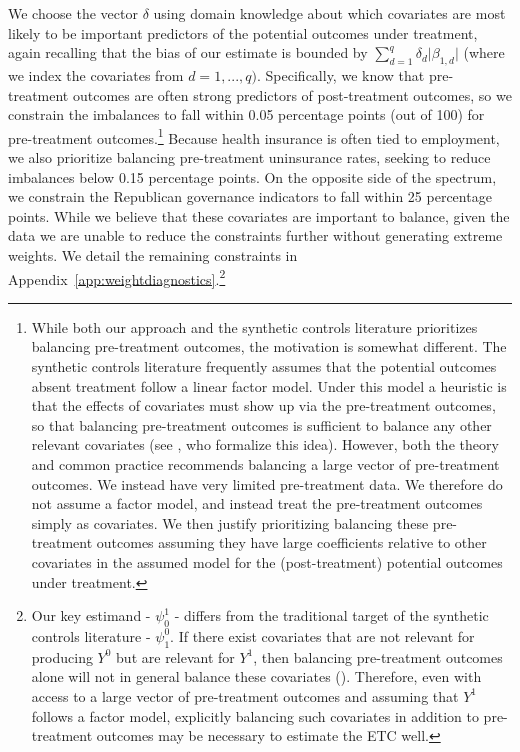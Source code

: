\documentclass[aoas]{imsart}
\theoremstyle{plain}
\theoremstyle{remark}
\begin{document}
We choose the vector $\delta$ using domain knowledge about which covariates are most likely to be important predictors of the potential outcomes under treatment, again recalling that the bias of our estimate is bounded by $\sum_{d=1}^q \delta_d \lvert \beta_{1,d} \rvert$ (where we index the covariates from $d = 1, ..., q)$. Specifically, we know that pre-treatment outcomes are often strong predictors of post-treatment outcomes, so we constrain the imbalances to fall within 0.05 percentage points (out of 100) for pre-treatment outcomes.\footnote{While both our approach and the synthetic controls literature prioritizes balancing pre-treatment outcomes, the motivation is somewhat different. The synthetic controls literature frequently assumes that the potential outcomes absent treatment follow a linear factor model. Under this model a heuristic is that the effects of covariates must show up via the pre-treatment outcomes, so that balancing pre-treatment outcomes is sufficient to balance any other relevant covariates (see \cite{botosaru2019role}, who formalize this idea). However, both the theory and common practice recommends balancing a large vector of pre-treatment outcomes. We instead have very limited pre-treatment data. We therefore do not assume a factor model, and instead treat the pre-treatment outcomes simply as covariates. We then justify prioritizing balancing these pre-treatment outcomes assuming they have large coefficients relative to other covariates in the assumed model for the (post-treatment) potential outcomes under treatment.} Because health insurance is often tied to employment, we also prioritize balancing pre-treatment uninsurance rates, seeking to reduce imbalances below 0.15 percentage points. On the opposite side of the spectrum, we constrain the Republican governance indicators to fall within 25 percentage points. While we believe that these covariates are important to balance, given the data we are unable to reduce the constraints further without generating extreme weights. We detail the remaining constraints in Appendix~\ref{app:weightdiagnostics}.\footnote{Our key estimand - $\psi_0^1$ - differs from the traditional target of the synthetic controls literature - $\psi^0_1$. If there exist covariates that are not relevant for producing $Y^0$ but are relevant for $Y^1$, then balancing pre-treatment outcomes alone will not in general balance these covariates (\cite{botosaru2019role}). Therefore, even with access to a large vector of pre-treatment outcomes and assuming that $Y^1$ follows a factor model, explicitly balancing such covariates in addition to pre-treatment outcomes may be necessary to estimate the ETC well.}
\end{document}
